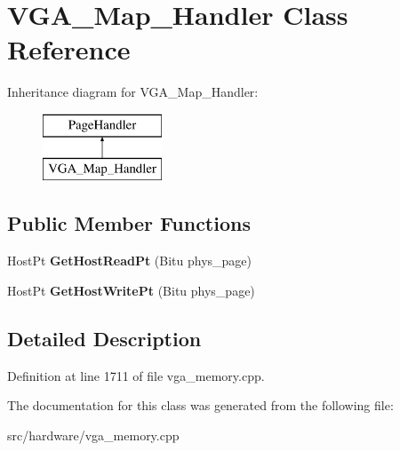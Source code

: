\hypertarget{classVGA__Map__Handler}{\section{V\-G\-A\-\_\-\-Map\-\_\-\-Handler Class Reference}
\label{classVGA__Map__Handler}
}
Inheritance diagram for V\-G\-A\-\_\-\-Map\-\_\-\-Handler\-:\begin{figure}[H]
\begin{center}
\leavevmode
\includegraphics[height=2.000000cm]{classVGA__Map__Handler}
\end{center}
\end{figure}
\subsection*{Public Member Functions}
\begin{DoxyCompactItemize}
\item 
\hypertarget{classVGA__Map__Handler_a23bc58413fad28c04578297037382551}{Host\-Pt {\bfseries Get\-Host\-Read\-Pt} (Bitu phys\-\_\-page)}\label{classVGA__Map__Handler_a23bc58413fad28c04578297037382551}

\item 
\hypertarget{classVGA__Map__Handler_aaad4aea2654a2d31733a7213894d90a4}{Host\-Pt {\bfseries Get\-Host\-Write\-Pt} (Bitu phys\-\_\-page)}\label{classVGA__Map__Handler_aaad4aea2654a2d31733a7213894d90a4}

\end{DoxyCompactItemize}


\subsection{Detailed Description}


Definition at line 1711 of file vga\-\_\-memory.\-cpp.



The documentation for this class was generated from the following file\-:\begin{DoxyCompactItemize}
\item 
src/hardware/vga\-\_\-memory.\-cpp\end{DoxyCompactItemize}
